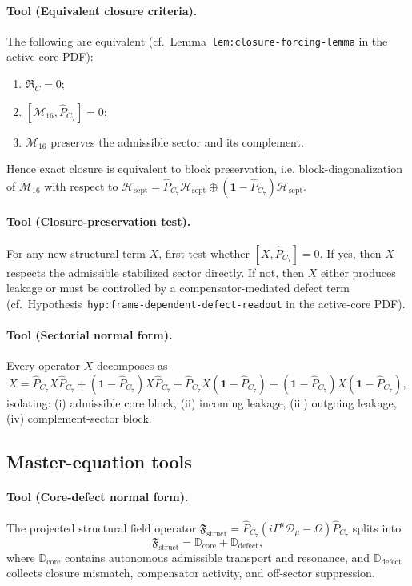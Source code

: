 \paragraph{Tool (Equivalent closure criteria).}
The following are equivalent
(cf.\ Lemma~\texttt{lem:closure-forcing-lemma} in the active-core PDF):
\begin{enumerate}[label=(\roman*)]
  \item $\mathfrak{R}_C = 0$;
  \item $[\mathcal{M}_{16}, \hat{P}_{C_7}] = 0$;
  \item $\mathcal{M}_{16}$ preserves the admissible sector and its complement.
\end{enumerate}
Hence exact closure is equivalent to block preservation, i.e. block-diagonalization of $\mathcal{M}_{16}$ with respect to
$\mathcal{H}_{\mathrm{sept}} = \hat{P}_{C_7}\mathcal{H}_{\mathrm{sept}}
\oplus (\mathbf{1} - \hat{P}_{C_7})\mathcal{H}_{\mathrm{sept}}$.

\paragraph{Tool (Closure-preservation test).}
For any new structural term $X$, first test whether
$[X, \hat{P}_{C_7}] = 0$.
If yes, then $X$ respects the admissible stabilized sector directly.
If not, then $X$ either produces leakage or must be controlled by a
compensator-mediated defect term
(cf.\ Hypothesis~\texttt{hyp:frame-dependent-defect-readout} in the active-core PDF).

\paragraph{Tool (Sectorial normal form).}
Every operator $X$ decomposes as
\[
  X = \hat{P}_{C_7}X\hat{P}_{C_7}
    + (\mathbf{1}-\hat{P}_{C_7})X\hat{P}_{C_7}
    + \hat{P}_{C_7}X(\mathbf{1}-\hat{P}_{C_7})
    + (\mathbf{1}-\hat{P}_{C_7})X(\mathbf{1}-\hat{P}_{C_7}),
\]
isolating: (i) admissible core block, (ii) incoming leakage,
(iii) outgoing leakage, (iv) complement-sector block.

\subsection*{Master-equation tools}

\paragraph{Tool (Core-defect normal form).}
The projected structural field operator
$\mathfrak{F}_{\mathrm{struct}}
= \hat{P}_{C_7}(i\Gamma^\mu\mathcal{D}_\mu - \Omega)\hat{P}_{C_7}$
splits into
\[
  \mathfrak{F}_{\mathrm{struct}}
  = \mathbb{D}_{\mathrm{core}} + \mathbb{D}_{\mathrm{defect}},
\]
where $\mathbb{D}_{\mathrm{core}}$ contains autonomous admissible
transport and resonance, and $\mathbb{D}_{\mathrm{defect}}$ collects
closure mismatch, compensator activity, and off-sector suppression.

